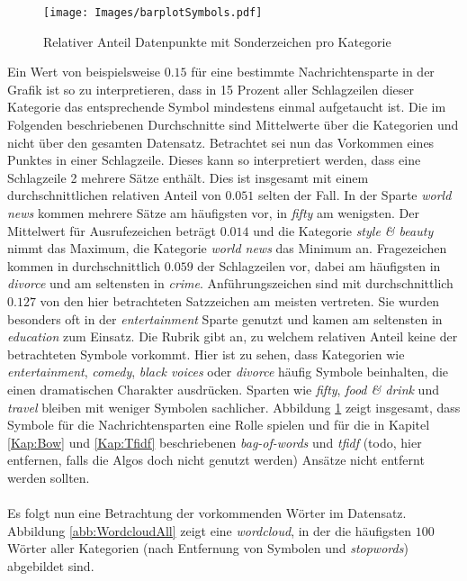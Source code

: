 \documentclass[a4paper,11pt]{article}
\begin{document}
\begin{figure}[ht]
    \centering
\texttt{[image: Images/barplotSymbols.pdf]} 
\label{abb:barplotSymbols}
\caption{Relativer Anteil Datenpunkte mit Sonderzeichen pro Kategorie}
\end{figure}

Ein Wert von beispielsweise $0.15$ für eine bestimmte Nachrichtensparte in der Grafik ist so zu interpretieren, dass in 15 Prozent aller Schlagzeilen dieser Kategorie das entsprechende Symbol mindestens einmal aufgetaucht ist. Die im Folgenden beschriebenen Durchschnitte sind Mittelwerte über die Kategorien und nicht über den gesamten Datensatz. Betrachtet sei nun das Vorkommen eines Punktes in einer Schlagzeile. Dieses kann so interpretiert werden, dass eine Schlagzeile 2
mehrere Sätze enthält. Dies ist insgesamt mit einem durchschnittlichen relativen Anteil von $0.051$ selten der Fall. In der Sparte \textit{world news} kommen mehrere Sätze am häufigsten vor, in \textit{fifty} am wenigsten. Der Mittelwert für Ausrufezeichen beträgt $0.014$ und die Kategorie \textit{style \& beauty} nimmt das Maximum, die Kategorie \textit{world news} das Minimum an. Fragezeichen kommen in durchschnittlich $0.059$ der Schlagzeilen vor, dabei am häufigsten in \textit{divorce} und am seltensten in \textit{crime}. Anführungszeichen sind mit durchschnittlich $0.127$ von den hier betrachteten Satzzeichen am meisten vertreten. Sie wurden besonders oft in der \textit{entertainment} Sparte genutzt und kamen am seltensten in \textit{education} zum Einsatz. Die Rubrik  gibt an, zu welchem relativen Anteil keine der betrachteten Symbole vorkommt. Hier ist zu sehen, dass Kategorien wie \textit{entertainment}, \textit{comedy}, \textit{black voices} oder \textit{divorce} häufig Symbole beinhalten, die einen dramatischen Charakter ausdrücken. Sparten wie \textit{fifty}, \textit{food \& drink} und \textit{travel} bleiben mit weniger Symbolen sachlicher. Abbildung \ref{abb:barplotSymbols} zeigt insgesamt, dass Symbole für die Nachrichtensparten eine Rolle spielen und für die in Kapitel \ref{Kap:Bow} und \ref{Kap:Tfidf} beschriebenen \textit{bag-of-words} und \textit{tfidf} (todo, hier entfernen, falls die Algos doch nicht genutzt werden) Ansätze nicht entfernt werden sollten.\\
\\
Es folgt nun eine Betrachtung der vorkommenden Wörter im Datensatz. Abbildung \ref{abb:WordcloudAll} zeigt eine \textit{wordcloud}, in der die häufigsten $100$ Wörter aller Kategorien (nach Entfernung von Symbolen und \textit{stopwords}) abgebildet sind.
\end{document}
